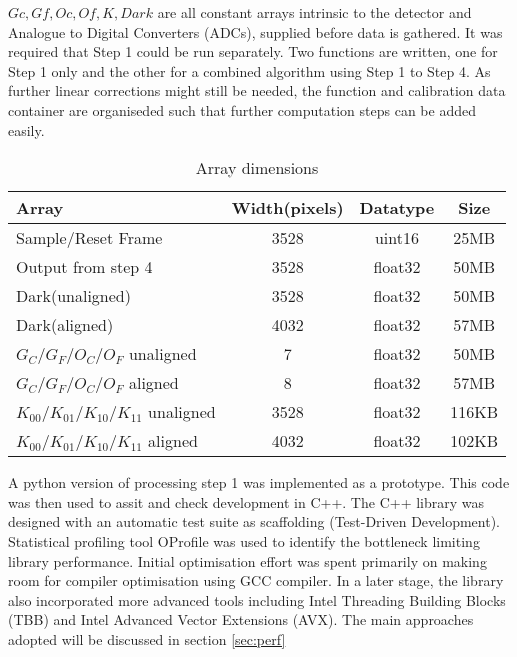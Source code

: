 \documentclass[journal]{IEEEtran}
\begin{document}
$Gc, Gf, Oc, Of, K, Dark$ are all constant arrays intrinsic to the detector and Analogue to Digital Converters (ADCs), supplied before data is gathered. It was required that Step 1 could be run separately. Two functions are written, one for Step 1 only and the other for a combined algorithm using Step 1 to Step 4. As further linear corrections might still be needed, the function and calibration data container are organiseded such that further computation steps can be added easily.\\

\begin{table}[h]

\label{array_dims}
\centering
\begin{tabular}{l c c c}
\hline
Array 							& Width(pixels)	 & Datatype  &Size\\
\hline\hline
Sample/Reset Frame       				& 3528 		& uint16     &25MB\\
\hline
Output from step 4					& 3528		& float32    &50MB\\
\hline
Dark(unaligned)					 	& 3528		& float32     &50MB\\
\hline
Dark(aligned)				 		& 4032 		& float32     &57MB\\
\hline
$G_C/G_F/O_C/O_F$ unaligned 				& 7   		 & float32    &50MB\\
\hline
$G_C/G_F/O_C/O_F$ aligned 				& 8    		& float32     &57MB\\
\hline
$K_{00}/K_{01}/K_{10}/K_{11}$ unaligned 	& 3528 & float32     & 116KB\\
\hline
$K_{00}/K_{01}/K_{10}/K_{11}$ aligned 		& 4032 & float32     & 102KB\\
\hline

\end{tabular}
\caption{Array dimensions}
\end{table}

A python version of processing step 1 was implemented as a prototype. This code was then used to assit and check development in C++. The C++ library was designed with an automatic test suite as scaffolding (Test-Driven Development). Statistical profiling tool OProfile was used to identify the bottleneck limiting library performance. Initial optimisation effort was spent primarily on making room for compiler optimisation using GCC compiler. In a later stage, the library also incorporated more advanced tools including Intel Threading Building Blocks (TBB) and Intel Advanced Vector Extensions (AVX). The main approaches adopted will be discussed in section \ref{sec:perf}
\end{document}
